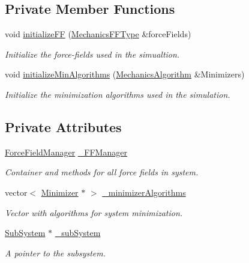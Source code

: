 \subsection*{Private Member Functions}
\begin{DoxyCompactItemize}
\item 
void \hyperlink{classMController_a3e935a48c92ced31df17bb724e90669c}{initialize\+F\+F} (\hyperlink{structMechanicsFFType}{Mechanics\+F\+F\+Type} \&force\+Fields)
\begin{DoxyCompactList}\small\item\em Initialize the force-\/fields used in the simualtion. \end{DoxyCompactList}\item 
void \hyperlink{classMController_ad19cdee04c861fa4fc173d0c10956548}{initialize\+Min\+Algorithms} (\hyperlink{structMechanicsAlgorithm}{Mechanics\+Algorithm} \&Minimizers)
\begin{DoxyCompactList}\small\item\em Initialize the minimization algorithms used in the simulation. \end{DoxyCompactList}\end{DoxyCompactItemize}
\subsection*{Private Attributes}
\begin{DoxyCompactItemize}
\item 
\hyperlink{classForceFieldManager}{Force\+Field\+Manager} \hyperlink{classMController_ac3c4b1b840a877dcb713c7063d5c94b7}{\+\_\+\+F\+F\+Manager}
\begin{DoxyCompactList}\small\item\em Container and methods for all force fields in system. \end{DoxyCompactList}\item 
vector$<$ \hyperlink{classMinimizer}{Minimizer} $\ast$ $>$ \hyperlink{classMController_a332c6625d156824a3bdd5cb44b57c142}{\+\_\+minimizer\+Algorithms}
\begin{DoxyCompactList}\small\item\em Vector with algorithms for system minimization. \end{DoxyCompactList}\item 
\hyperlink{classSubSystem}{Sub\+System} $\ast$ \hyperlink{classMController_a638abd4c155c7bafde6b9bff76255f73}{\+\_\+sub\+System}
\begin{DoxyCompactList}\small\item\em A pointer to the subsystem. \end{DoxyCompactList}\end{DoxyCompactItemize}


